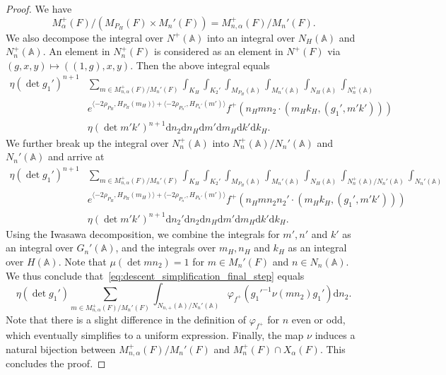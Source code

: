 \documentclass[letterpaper,11pt]{amsart}
\newcommand{\bA}{\mathbb{A}}
\newcommand{\rd}{\mathrm{d}}
\newcommand{\<}{\negthickspace}
\theoremstyle{definition}
\theoremstyle{plain}
\theoremstyle{remark}
\numberwithin{equation}{section}
\begin{document}
\begin{proof}
We have
    \[
    M^+_{\alpha}(F)/ (M_{P_H}(F)\times
    M_n'(F))=M^+_{n,\alpha}(F)/M_n'(F).
    \]
We also decompose the integral over $N^+(\bA)$ into an integral over ${N_H(\bA)}$ and $N_n^+(\bA)$. An element in $N^+_n(F)$ is considered as an element in $N^+(F)$ via
$(g, x, y) \mapsto ((1, g), x, y)$. Then the above integral equals
    \begin{align*}
    \eta(\det g_1')^{n+1}
    &\sum_{m \in M^+_{n,\alpha}(F)/M_n'(F)}
    \int_{K_H} \int_{K_2'}
    \int_{M_{P_H}(\bA)} \int_{M_n'(\bA)}
    \int_{N_H(\bA)} \int_{N_{n}^+(\bA)}   \\
    & e^{\langle
    -2\rho_{P_H},H_{P_H}(m_H)\rangle+
    \langle -2\rho_{P_n'},H_{P_n'}(m') \rangle }
    f^+ \left(n_H m n_2 \cdot (m_H k_H, (g_1',m'k'))\right)\\
    &\eta(\det m'k')^{n+1} \rd n_2 \rd n_H \rd m' \rd m_H \rd k' \rd k_H.
    \end{align*}
We further break up the integral over $N_{n}^+(\bA)$ into
$N_{n}^+(\bA)/N_n'(\bA)$ and $N_n'(\bA)$ and arrive at
    \begin{equation}    \label{eq:descent_simplification_final_step}
    \begin{aligned}
    \eta(\det g_1')^{n+1}
    &\sum_{m \in M^+_{n,\alpha}(F)/M_n'(F)}
    \int_{K_H} \int_{K_2'}
    \int_{M_{P_H}(\bA)} \int_{M_n'(\bA)}
    \int_{N_H(\bA)} \int_{N_{n}^+(\bA)/N_n'(\bA)} \int_{N_n'(\bA)}   \\
    & e^{\langle
    -2\rho_{P_H},H_{P_H}(m_H)\rangle+
    \langle -2\rho_{P_n'},H_{P_n'}(m') \rangle }
    f^+ \left(n_H m n_2 n_2' \cdot (m_H k_H, (g_1', m'k'))\right)\\
    &\eta(\det m'k')^{n+1}
    \rd n_2' \rd n_2 \rd n_H \rd m' \rd m_H \rd k' \rd k_H.
    \end{aligned}
    \end{equation}
Using the Iwasawa decomposition, we combine the integrals for $m', n'$ and
$k'$ as an integral over $G_n'(\bA)$, and the integrals over $m_H, n_H$ and
$k_H$ as an integral over $H(\bA)$. Note that $\mu(\det mn_2)=1$ for $m \in
M_n'(F)$ and $n \in N_n(\bA)$. We thus conclude
that~\eqref{eq:descent_simplification_final_step} equals
    \[
    \eta(\det g_1') \sum_{m \in M^+_{n,\alpha}(F)/M_n'(F)}
    \int_{N_{n,+}(\bA)/N_n'(\bA)} \varphi_{f^+}
    \left(  g_1'^{-1}\nu(mn_2) g_1' \right)
    \rd n_2.
    \]
Note that there is a slight difference in the definition of $\varphi_{f^+}$
for $n$ even or odd, which eventually simplifies to a uniform expression.
Finally, the map $\nu$ induces a natural bijection between $M_{n,
\alpha}^+(F)/M_n'(F)$ and $M_{n}^+(F) \cap X_{\alpha}(F)$. This concludes
the proof.
\end{proof}
\end{document}
